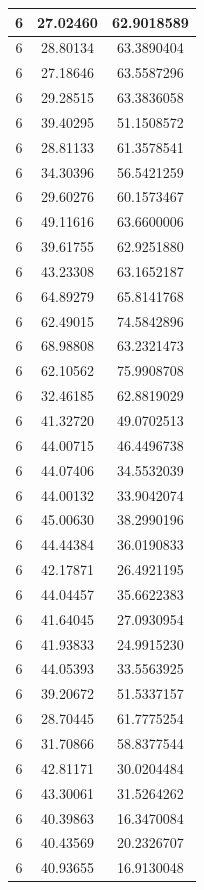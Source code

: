 \documentclass[
]{book}
\begin{document}
\begin{tabular}{c|c|c}
\hline
6 & 27.02460 & 62.9018589\\
\hline
6 & 28.80134 & 63.3890404\\
\hline
6 & 27.18646 & 63.5587296\\
\hline
6 & 29.28515 & 63.3836058\\
\hline
6 & 39.40295 & 51.1508572\\
\hline
6 & 28.81133 & 61.3578541\\
\hline
6 & 34.30396 & 56.5421259\\
\hline
6 & 29.60276 & 60.1573467\\
\hline
6 & 49.11616 & 63.6600006\\
\hline
6 & 39.61755 & 62.9251880\\
\hline
6 & 43.23308 & 63.1652187\\
\hline
6 & 64.89279 & 65.8141768\\
\hline
6 & 62.49015 & 74.5842896\\
\hline
6 & 68.98808 & 63.2321473\\
\hline
6 & 62.10562 & 75.9908708\\
\hline
6 & 32.46185 & 62.8819029\\
\hline
6 & 41.32720 & 49.0702513\\
\hline
6 & 44.00715 & 46.4496738\\
\hline
6 & 44.07406 & 34.5532039\\
\hline
6 & 44.00132 & 33.9042074\\
\hline
6 & 45.00630 & 38.2990196\\
\hline
6 & 44.44384 & 36.0190833\\
\hline
6 & 42.17871 & 26.4921195\\
\hline
6 & 44.04457 & 35.6622383\\
\hline
6 & 41.64045 & 27.0930954\\
\hline
6 & 41.93833 & 24.9915230\\
\hline
6 & 44.05393 & 33.5563925\\
\hline
6 & 39.20672 & 51.5337157\\
\hline
6 & 28.70445 & 61.7775254\\
\hline
6 & 31.70866 & 58.8377544\\
\hline
6 & 42.81171 & 30.0204484\\
\hline
6 & 43.30061 & 31.5264262\\
\hline
6 & 40.39863 & 16.3470084\\
\hline
6 & 40.43569 & 20.2326707\\
\hline
6 & 40.93655 & 16.9130048\\

\end{tabular}
\end{document}
